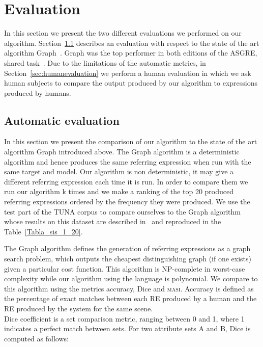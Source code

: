 \section{Evaluation} \label{sec:evaluation}

In this section we present the two different evaluations we performed on our algorithm. Section~\ref{sec:automaticevaluation} describes an evaluation with respect to the state of the art algorithm Graph~\cite{KrahmerGRAPH}. Graph was the top performer in both editions of the ASGRE, shared task~\cite{gatt-balz-kow:2008:ENLG}. Due to the limitations of the automatic metrics, in Section~\ref{sec:humanevaluation} we perform a human evaluation in  which we ask human subjects to compare the output produced by our algorithm to expressions produced by humans. 
  

\subsection{Automatic evaluation} \label{sec:automaticevaluation}

In this section we present the comparison of our algorithm to the state of the art algorithm Graph introduced above. The Graph algorithm is a deterministic algorithm and hence produces the same referring expression when run with the same target and model. Our algorithm is non deterministic, it may give a different referring expression each time it is run. In order to compare them we run our algorithm k times and we make a ranking of the top 20 produced referring expressions ordered by the frequency they were produced. We use the test part of the TUNA corpus to compare ourselves to the Graph algorithm whose results on this dataset are described in~\cite{KrahmerGRAPH} and reproduced in the Table~\ref{Tabla_sis_1_20}. 

The Graph algorithm defines the generation of referring expressions as a graph search problem, which outputs the cheapest distinguishing graph (if one exists) given a particular cost function. This algorithm is NP-complete in worst-case complexity while our algorithm using the \el language is polynomial. We compare to this algorithm using the metrics accuracy, Dice and \textsc{masi}. Accuracy is defined as the percentage of exact matches between each RE produced by a human and the RE produced by the system for the same scene. \\

Dice coefficient is a set comparison metric, ranging between 0 and 1, where
1 indicates a perfect match between sets. For two
attribute sets A and B, Dice is computed as follows:\\


